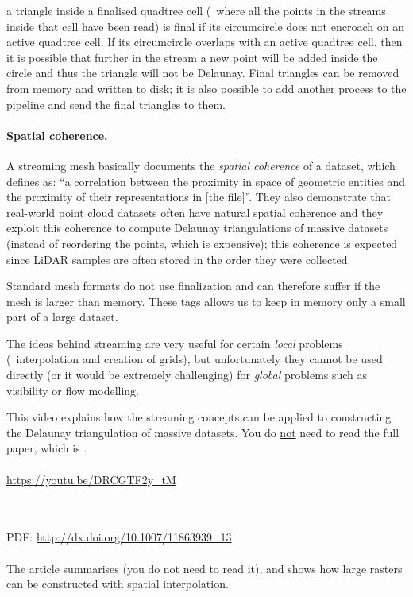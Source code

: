 a triangle inside a finalised quadtree cell (\ie\ where all the points in the streams inside that cell have been read) is final if its circumcircle does not encroach on an active quadtree cell.
If its circumcircle overlaps with an active quadtree cell, then it is possible that further in the stream a new point will be added inside the circle and thus the triangle will not be Delaunay.
Final triangles can be removed from memory and written to disk; it is also possible to add another process to the pipeline and send the final triangles to them.


\paragraph{Spatial coherence.}

A streaming mesh basically documents the \emph{spatial coherence}%
of a dataset, which \citet{Isenburg06} defines as: ``a correlation between the proximity in space of geometric entities and the proximity of their representations in [the file]''.
They also demonstrate that real-world point cloud datasets often have natural spatial coherence and they exploit this coherence to compute Delaunay triangulations of massive datasets (instead of reordering the points, which is expensive); this coherence is expected since LiDAR samples are often stored in the order they were collected.

Standard mesh formats do not use finalization and can therefore suffer if the mesh is larger than memory.
These tags allows us to keep in memory only a small part of a large dataset.


The ideas behind streaming are very useful for certain \emph{local} problems (\eg\ interpolation and creation of grids), but unfortunately they cannot be used directly (or it would be extremely challenging) for \emph{global} problems such as visibility or flow modelling.

\begin{kaobox-toread}[frametitle=\faExternalLink\ To read or to watch]
  This video explains how the streaming concepts can be applied to constructing the Delaunay triangulation of massive datasets.
  You do \underline{not} need to read the full paper, which is \citet{Isenburg06}.
  \\ \\
  \url{https://youtu.be/DRCGTF2y_tM}
\end{kaobox-toread}

\begin{kaobox-toread}[frametitle=\faExternalLink\ To read or to watch]
  \\ \\
  PDF: \url{http://dx.doi.org/10.1007/11863939_13}
  \\ \\
  The article summarises \citet{Isenburg06} (you do not need to read it), and shows how large rasters can be constructed with spatial interpolation.
\end{kaobox-toread}


